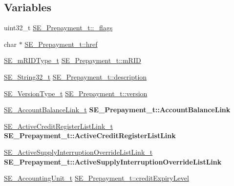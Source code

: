\subsection*{Variables}
\begin{DoxyCompactItemize}
\item 
uint32\+\_\+t \hyperlink{group__Prepayment_gaabf22751d856f247a3f417b5ee94af95}{S\+E\+\_\+\+Prepayment\+\_\+t\+::\+\_\+flags}
\item 
char $\ast$ \hyperlink{group__Prepayment_gaa5be0767476c9086c9dfb595cf50d8cc}{S\+E\+\_\+\+Prepayment\+\_\+t\+::href}
\item 
\hyperlink{group__mRIDType_gac74622112f3a388a2851b2289963ba5e}{S\+E\+\_\+m\+R\+I\+D\+Type\+\_\+t} \hyperlink{group__Prepayment_gaffa073447cfffd53adc271415a6cc365}{S\+E\+\_\+\+Prepayment\+\_\+t\+::m\+R\+ID}
\item 
\hyperlink{group__String32_gac9f59b06b168b4d2e0d45ed41699af42}{S\+E\+\_\+\+String32\+\_\+t} \hyperlink{group__Prepayment_ga875dbbfc5990ea5605a6b10150c00653}{S\+E\+\_\+\+Prepayment\+\_\+t\+::description}
\item 
\hyperlink{group__VersionType_ga4b8d27838226948397ed99f67d46e2ae}{S\+E\+\_\+\+Version\+Type\+\_\+t} \hyperlink{group__Prepayment_ga5eeb01e55108aff758d1ca928fe9172a}{S\+E\+\_\+\+Prepayment\+\_\+t\+::version}
\item 
\mbox{\label{group__Prepayment_gac6cb5ef5db133a641b7f89575ac32863}} 
\hyperlink{structSE__AccountBalanceLink__t}{S\+E\+\_\+\+Account\+Balance\+Link\+\_\+t} {\bfseries S\+E\+\_\+\+Prepayment\+\_\+t\+::\+Account\+Balance\+Link}
\item 
\mbox{\label{group__Prepayment_gaa67fef9ffb831dad038cd0ddc5f0a639}} 
\hyperlink{structSE__ActiveCreditRegisterListLink__t}{S\+E\+\_\+\+Active\+Credit\+Register\+List\+Link\+\_\+t} {\bfseries S\+E\+\_\+\+Prepayment\+\_\+t\+::\+Active\+Credit\+Register\+List\+Link}
\item 
\mbox{\label{group__Prepayment_ga87e02cb68498f438c944377ed2291108}} 
\hyperlink{structSE__ActiveSupplyInterruptionOverrideListLink__t}{S\+E\+\_\+\+Active\+Supply\+Interruption\+Override\+List\+Link\+\_\+t} {\bfseries S\+E\+\_\+\+Prepayment\+\_\+t\+::\+Active\+Supply\+Interruption\+Override\+List\+Link}
\item 
\hyperlink{structSE__AccountingUnit__t}{S\+E\+\_\+\+Accounting\+Unit\+\_\+t} \hyperlink{group__Prepayment_ga8d49cc2f07392b397d2141d692eac22c}{S\+E\+\_\+\+Prepayment\+\_\+t\+::credit\+Expiry\+Level}

\end{DoxyCompactItemize}
